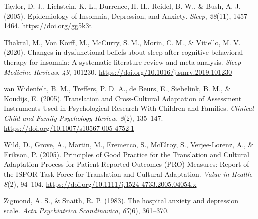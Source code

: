 \documentclass[
  ,doc,11pt, twoside,floatsintext]{apa6}
\newlength{\cslhangindent}
\newlength{\cslentryspacingunit} %
\newenvironment{CSLReferences}[2] %
 {%
  \setlength{\parindent}{0pt}
  \ifodd #1
  \let\oldpar\par
  \def\par{\hangindent=\cslhangindent\oldpar}
  \fi
  \setlength{\parskip}{#2\cslentryspacingunit}
 }%
 {}
\begin{document}
\begin{CSLReferences}{1}{0}
\leavevmode{}%
Taylor, D. J., Lichstein, K. L., Durrence, H. H., Reidel, B. W., \& Bush, A. J. (2005). Epidemiology of {Insomnia}, {Depression}, and {Anxiety}. \emph{Sleep}, \emph{28}(11), 1457--1464. \url{https://doi.org/gg5k3t}

\leavevmode{}%
Thakral, M., Von Korff, M., McCurry, S. M., Morin, C. M., \& Vitiello, M. V. (2020). Changes in dysfunctional beliefs about sleep after cognitive behavioral therapy for insomnia: {A} systematic literature review and meta-analysis. \emph{Sleep Medicine Reviews}, \emph{49}, 101230. \url{https://doi.org/10.1016/j.smrv.2019.101230}

\leavevmode{}%
van Widenfelt, B. M., Treffers, P. D. A., de Beurs, E., Siebelink, B. M., \& Koudijs, E. (2005). Translation and {Cross-Cultural Adaptation} of {Assessment Instruments Used} in {Psychological Research With Children} and {Families}. \emph{Clinical Child and Family Psychology Review}, \emph{8}(2), 135--147. \url{https://doi.org/10.1007/s10567-005-4752-1}

\leavevmode{}%
Wild, D., Grove, A., Martin, M., Eremenco, S., McElroy, S., Verjee-Lorenz, A., \& Erikson, P. (2005). Principles of {Good Practice} for the {Translation} and {Cultural Adaptation Process} for {Patient-Reported Outcomes} ({PRO}) {Measures}: {Report} of the {ISPOR Task Force} for {Translation} and {Cultural Adaptation}. \emph{Value in Health}, \emph{8}(2), 94--104. \url{https://doi.org/10.1111/j.1524-4733.2005.04054.x}

\leavevmode{}%
Zigmond, A. S., \& Snaith, R. P. (1983). The hospital anxiety and depression scale. \emph{Acta Psychiatrica Scandinavica}, \emph{67}(6), 361--370.

\end{CSLReferences}


\clearpage
\end{document}
